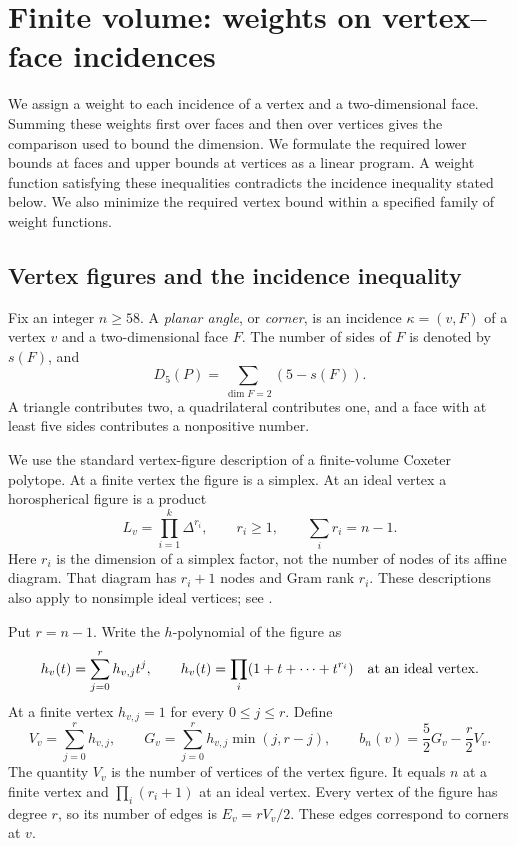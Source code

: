 \documentclass[11pt]{article}
\theoremstyle{definition}
\theoremstyle{remark}
\numberwithin{equation}{section}
\begin{document}
\section{Finite volume: weights on vertex--face incidences}
\label{fv:section}

We assign a weight to each incidence of a vertex and a two-dimensional
face. Summing these weights first over faces and then over vertices
gives the comparison used to bound the dimension. We formulate the
required lower bounds at faces and upper bounds at vertices as a
linear program. A weight function satisfying these inequalities
contradicts the incidence inequality stated below. We also minimize the required vertex bound
within a specified family of weight functions.

\subsection{Vertex figures and the incidence inequality}
\label{fv:incidence}

Fix an integer $n\ge58$. A \emph{planar angle}, or \emph{corner},
is an incidence $\kappa=(v,F)$ of a vertex $v$ and a two-dimensional
face $F$.
The number of sides of $F$ is denoted by $s(F)$, and
\begin{equation}\label{fv:defect}
 D_5(P)=\sum_{\dim F=2}(5-s(F)).
\end{equation}
A triangle contributes two, a quadrilateral contributes one, and a
face with at least five sides contributes a nonpositive number.

We use the standard vertex-figure description of a finite-volume
Coxeter polytope. At a finite vertex the figure is a simplex. At an
ideal vertex a horospherical figure is a product
\begin{equation}\label{fv:link}
 L_v=\prod_{i=1}^k\Delta^{r_i},\qquad
 r_i\ge1,\qquad \sum_i r_i=n-1.
\end{equation}
Here $r_i$ is the dimension of a simplex factor, not the number of
nodes of its affine diagram. That diagram has $r_i+1$ nodes and Gram
rank $r_i$. These descriptions also apply to nonsimple ideal vertices; see
\cite{BoundsArticle,BoundsSupplement}.

Put $r=n-1$. Write the $h$-polynomial of the figure as
\begin{equation}\label{fv:hpolynomial}
 h_v(t)=\sum_{j=0}^r h_{v,j}t^j,
 \qquad
 h_v(t)=\prod_i(1+t+\cdots+t^{r_i})
 \quad\hbox{at an ideal vertex}.
\end{equation}
At a finite vertex $h_{v,j}=1$ for every $0\le j\le r$.
Define
\begin{equation}\label{fv:allowance-general}
 V_v=\sum_{j=0}^r h_{v,j},\qquad
 G_v=\sum_{j=0}^r h_{v,j}\min(j,r-j),\qquad
 b_n(v)=\frac52G_v-\frac r2V_v.
\end{equation}
The quantity $V_v$ is the number of vertices of the vertex figure.
It equals $n$ at a finite vertex and $\prod_i(r_i+1)$ at an ideal
vertex. Every vertex of the figure has degree $r$, so its number of
edges is $E_v=rV_v/2$. These edges correspond to corners at $v$.
\end{document}
